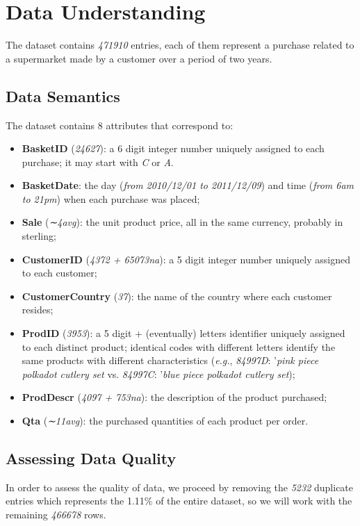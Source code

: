 \section{Data Understanding}

The dataset contains \emph{471910} entries, each of them represent a purchase related to a supermarket made by a customer over a period of two years.

\subsection{Data Semantics}

The dataset contains 8 attributes that correspond to:

\begin{itemize}
\item \textbf{BasketID} (\emph{24627}): a 6 digit integer number uniquely assigned to each purchase; it may start with \emph{C} or \emph{A}.
\item \textbf{BasketDate}: the day (\emph{from 2010/12/01 to 2011/12/09}) and time (\emph{from 6am to 21pm}) when each purchase was placed;
\item \textbf{Sale} (\emph{∼4avg}): the unit product price, all in the same currency, probably in sterling;
\item \textbf{CustomerID} (\emph{4372 + 65073na}): a 5 digit integer number uniquely assigned to each customer;
\item \textbf{CustomerCountry} (\emph{37}): the name of the country where each customer resides;
\item \textbf{ProdID} (\emph{3953}): a 5 digit + (eventually) letters identifier uniquely assigned to each distinct product; identical codes with different letters identify the same products with different characteristics (\emph{e.g.}, \emph{84997D}: '\emph{pink piece polkadot cutlery set} vs. \emph{84997C}: '\emph{blue piece polkadot cutlery set});
\item \textbf{ProdDescr} (\emph{4097 + 753na}): the description of the product purchased;
\item \textbf{Qta} (\emph{∼11avg}): the purchased quantities of each product per order.
\end{itemize}

\subsection{Assessing Data Quality}

In order to assess the quality of data, we proceed by removing the \emph{5232} duplicate entries which represents the 1.11\% of the entire dataset, so we will work with the remaining \emph{466678} rows.


